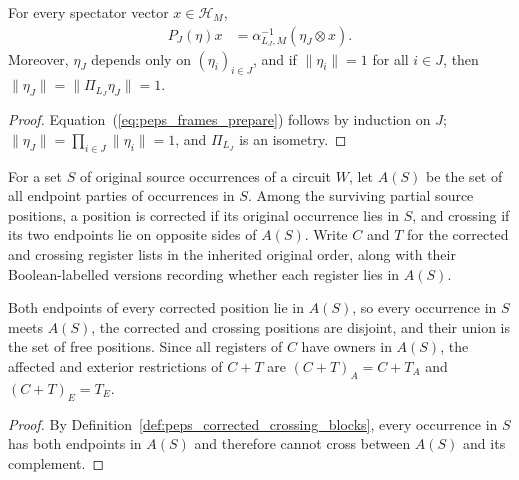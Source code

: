 \begin{lemma}
    \label{thm:peps_free_source_norm}
    \leanok
    For every spectator vector $x\in\mathcal H_M$,
    \begin{align}
        P_J(\eta)x & = \alpha_{L_J,M}^{-1}(\eta_J\otimes x).
        \label{eq:peps_frames_prepare}
    \end{align}
    Moreover, $\eta_J$ depends only on $(\eta_i)_{i\in J}$, and if $\|\eta_i\|=1$ for all $i\in J$, then $\|\eta_J\|=\|\Pi_{L_J}\eta_J\|=1$.
\end{lemma}
\begin{proof}
    \leanok
    Equation~(\ref{eq:peps_frames_prepare}) follows by induction on $J$; $\|\eta_J\|=\prod_{i\in J}\|\eta_i\|=1$, and $\Pi_{L_J}$ is an isometry.
\end{proof}

\begin{definition}
    \label{def:peps_corrected_crossing_blocks}
    \leanok
    For a set $S$ of original source occurrences of a circuit $W$, let
    $A(S)$ be the set of all endpoint parties of occurrences in $S$. Among the surviving partial
    source positions, a position is corrected if its original occurrence lies in $S$, and crossing if its two endpoints lie on opposite sides of $A(S)$.
    Write $C$ and $T$ for the corrected and crossing register lists in the inherited original order, along with their Boolean-labelled versions recording whether each register lies in $A(S)$.
\end{definition}

\begin{lemma}
    \label{thm:peps_corrected_crossing_masks}
    \leanok
    Both endpoints of every corrected position lie in $A(S)$, so every occurrence in $S$ meets $A(S)$, the corrected
    and crossing positions are disjoint, and their union is the set of free positions. Since all registers of $C$ have owners in $A(S)$, the affected and exterior restrictions of $C+T$ are $(C+T)_A=C+T_A$ and $(C+T)_E=T_E$.
\end{lemma}
\begin{proof}
    \leanok
    By Definition~\ref{def:peps_corrected_crossing_blocks}, every occurrence in $S$ has both endpoints in $A(S)$ and therefore cannot cross between $A(S)$ and its complement.
\end{proof}

